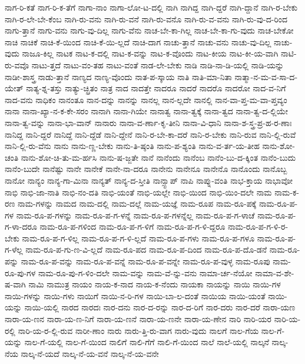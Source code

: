 {ನಾಗ-ರಿ-ಕತೆ
ನಾಗ-ರಿ-ಕ-ತೆಗೆ
ನಾಗಾ-ನಾಂ
ನಾಗಾ-ಲೋ-ಟ-ದಲ್ಲಿ
ನಾಗಿ
ನಾಗಿದ್ದ
ನಾಗಿ-ದ್ದರೆ
ನಾಗಿ-ದ್ದಾನೆ
ನಾಗಿ-ರ-ಬೇಕು
ನಾಗಿ-ರ-ಲೇ-ಬೇ-ಕೆಂಬ
ನಾಗಿ-ರು-ವನು
ನಾಗಿ-ರು-ವನೆ
ನಾಗಿ-ರು-ವನೊ
ನಾಗಿ-ರು-ವ-ವನು
ನಾಗಿ-ರು-ವು-ದ-ರಿಂದ
ನಾಗು-ತ್ತಾನೆ
ನಾಗು-ವನು
ನಾಗು-ವು-ದಿಲ್ಲ
ನಾಗು-ವೆನು
ನಾಚ-ಬೇ-ಕಾ-ಗಿಲ್ಲ
ನಾಚ-ಬೇ-ಕಾ-ಗು-ವುದು
ನಾಚ-ಬೇಕೋ
ನಾಚಿ
ನಾಚಿಕೆ
ನಾಚಿ-ಕೆ-ಯಿಂದ
ನಾಚಿ-ಕೆ-ಯಿ-ಲ್ಲದೆ
ನಾಚಿ-ದಾಗ
ನಾಚು-ತ್ತಾನೆ
ನಾಚು-ವನು
ನಾಚು-ವು-ದಿಲ್ಲ
ನಾಚು-ವುದು
ನಾಜೂ-ಕಿಲ್ಲ
ನಾಟಕ
ನಾಟ-ಕ-ದಲ್ಲಿ
ನಾಟ-ಕ-ವನ್ನು
ನಾಟ-ಕ-ವೊಂದು
ನಾಟ-ಕೀಯ
ನಾಟ-ಕೀ-ಯ-ವಾಗಿ
ನಾಟಿ-ರು-ವವೊ
ನಾಟು-ತ್ತದೆ
ನಾಟು-ವಂ-ತಹ
ನಾಟು-ವಂತೆ
ನಾಡ-ಲೇ-ಬೇಕು
ನಾಡಿ
ನಾಡಿ-ನಾ-ಡಿ-ಯಲ್ಲಿ
ನಾಡಿ-ಯನ್ನು
ನಾಡೀ-ಶಾಸ್ತ್ರ
ನಾಡು-ತ್ತಾನೆ
ನಾಣ್ಯದ
ನಾಣ್ಯ-ವೊಂದು
ನಾತ-ಪ-ಸ್ಕಾಯ
ನಾತಿ
ನಾತಿ-ಮಾ-ನಿತಾ
ನಾತ್ಮಾ-ನ-ಮ-ವ-ಸಾ-ದ-ಯೇತ್
ನಾತ್ಯ-ಶ್ನ-ತಸ್ತು
ನಾತ್ಯು-ಚ್ಛ್ರಿತಂ
ನಾತ್ರ
ನಾದ
ನಾದತ್ತೇ
ನಾದರೂ
ನಾದರೆ
ನಾದರೊ
ನಾದರೋ
ನಾದ-ವ-ನಿಗೆ
ನಾದ-ವನು
ನಾಧಿಕಂ
ನಾನಂತೂ
ನಾನ-ದನ್ನು
ನಾನನ್ನು
ನಾನಲ್ಲ
ನಾನ-ಲ್ಲದೇ
ನಾನಲ್ಲಿ
ನಾನ-ವಾ-ಪ್ತ-ಮ-ವಾ-ಪ್ತವ್ಯಂ
ನಾನಾ
ನಾನಾ-ಖ್ಯಾ-ನ-ಕ-ಕೇ-ಸರಂ
ನಾನಾಗಿ
ನಾನಾ-ಗಿಯೇ
ನಾನಾತ್ವ
ನಾನಾ-ತ್ವಕ್ಕೆ
ನಾನಾ-ತ್ವದ
ನಾನಾ-ತ್ವ-ದ-ಲ್ಲಿಯೇ
ನಾನಾ-ತ್ವ-ವನ್ನು
ನಾನಾ-ಭಾ-ವಾನ್
ನಾನಾರು
ನಾನಾ-ವ-ರ್ಣಾ-ಕೃ-ತೀನಿ
ನಾನಾ-ವಿ-ಧಾನಿ
ನಾನಾ-ಶ-ಸ್ತ್ರ-ಪ್ರ-ಹ-ರ-ಣಾಃ
ನಾನಿದ್ದ
ನಾನಿ-ದ್ದರೆ
ನಾನಿದ್ದೆ
ನಾನಿ-ದ್ದೆಡೆ
ನಾನಿ-ದ್ದೇನೆ
ನಾನಿ-ರ-ಬೇ-ಕಾ-ದರೆ
ನಾನಿ-ರ-ಬೇಕು
ನಾನಿ-ರುವ
ನಾನಿ-ಲ್ಲಿ-ರುವೆ
ನಾನಿ-ಲ್ಲಿ-ರು-ವೆನು
ನಾನು
ನಾನು-ಣ್ಣ-ಬೇಕು
ನಾನು-ತಿ-ಷ್ಠಂತಿ
ನಾನು-ಪ-ಶ್ಯಂತಿ
ನಾನು-ವ-ರ್ತ-ಯ-ತೀಹ
ನಾನು-ಶೋ-ಚಂತಿ
ನಾನು-ಶೋ-ಚಿ-ತು-ಮ-ರ್ಹಸಿ
ನಾನು-ಷ-ಜ್ಜತೇ
ನಾನೆ
ನಾನೆಂದು
ನಾನೆಂಬ
ನಾನೆಂ-ಬು-ದ-ಕ್ಕಿಂತ
ನಾನೆಂ-ಬುದು
ನಾನೆಂ-ಬುದೇ
ನಾನೆಷ್ಟು
ನಾನೇ
ನಾನೇಕೆ
ನಾನೇ-ನಾ-ದರೂ
ನಾನೇನು
ನಾನೇನೂ
ನಾನೇನೊ
ನಾನೊಂದು
ನಾನೊಬ್ಬ
ನಾನೋ
ನಾನ್ಯಂ
ನಾನ್ಯ-ಗಾ-ಮಿನಾ
ನಾನ್ಯತ್
ನಾನ್ಯ-ದ-ಸ್ತೀತಿ
ನಾನ್ಸ್ಟಾಪ್
ನಾಪಿ
ನಾಪ್ನು-ವಂತಿ
ನಾಭ-ಕ್ತಾಯ
ನಾಭಾವೋ
ನಾಭಿ
ನಾಭಿ-ಜಾ-ನಾತಿ
ನಾಭಿ-ನಂ-ದತಿ
ನಾಭಿ-ಯಂತೆ
ನಾಭಿ-ಯಲ್ಲೇ
ನಾಭಿ-ಯಿಂದ
ನಾಭಿ-ಯಿಂ-ದಲೇ
ನಾಮ
ನಾಮ-ಕ-ರಣ
ನಾಮ-ಗಳನ್ನು
ನಾಮದ
ನಾಮ-ದಲ್ಲಿ
ನಾಮ-ದಲ್ಲೆ
ನಾಮ-ಯಜ್ಞೆ
ನಾಮ-ರೂಪ
ನಾಮ-ರೂ-ಪಕ್ಕೆ
ನಾಮ-ರೂ-ಪ-ಗಳ
ನಾಮ-ರೂ-ಪ-ಗಳನ್ನು
ನಾಮ-ರೂ-ಪ-ಗ-ಳನ್ನೆ
ನಾಮ-ರೂ-ಪ-ಗಳನ್ನೆಲ್ಲ
ನಾಮ-ರೂ-ಪ-ಗ-ಳಾಚೆ
ನಾಮ-ರೂ-ಪ-ಗ-ಳಾ-ದರೂ
ನಾಮ-ರೂ-ಪ-ಗಳಿಂದ
ನಾಮ-ರೂ-ಪ-ಗ-ಳಿಗೆ
ನಾಮ-ರೂ-ಪ-ಗ-ಳಿ-ದ್ದರೂ
ನಾಮ-ರೂ-ಪ-ಗ-ಳಿ-ರ-ಬೇಕು
ನಾಮ-ರೂ-ಪ-ಗ-ಳಿಲ್ಲ
ನಾಮ-ರೂ-ಪ-ಗ-ಳಿ-ಲ್ಲದೆ
ನಾಮ-ರೂ-ಪ-ಗಳು
ನಾಮ-ರೂ-ಪ-ಗಳೂ
ನಾಮ-ರೂ-ಪ-ಗ-ಳೆಲ್ಲ
ನಾಮ-ರೂ-ಪ-ಗು-ಣ-ವಿ-ಲ್ಲದೆ
ನಾಮ-ರೂ-ಪದ
ನಾಮ-ರೂ-ಪ-ದಿಂದ
ನಾಮ-ರೂ-ಪ-ದೊ-ಡನೆ
ನಾಮ-ರೂ-ಪನ್ನು
ನಾಮ-ರೂ-ಪ-ವನ್ನು
ನಾಮ-ರೂ-ಪ-ವನ್ನೆ
ನಾಮ-ರೂ-ಪ-ವನ್ನೇ
ನಾಮ-ರೂ-ಪ-ವುಳ್ಳ
ನಾಮ-ರೂಪು
ನಾಮ-ರೂ-ಪು-ಗಳ
ನಾಮ-ರೂ-ಪು-ಗ-ಳಿಂ-ದಲೇ
ನಾಮ-ವನ್ನು
ನಾಮ-ವೆ-ನ್ನು-ವನು
ನಾಮಾ-ರ್ಚ-ನೆಯೋ
ನಾಮಾ-ವ-ಶೇ-ಷ-ವಾಗಿ
ನಾಮಿ
ನಾಮುತ್ರ
ನಾಯಂ
ನಾಯ-ಕ-ನಾದ
ನಾಯ-ಕ-ನೆಂದು
ನಾಯಕಾ
ನಾಯನ್ನು
ನಾಯಿ
ನಾಯಿ-ಗಳ
ನಾಯಿ-ಗಳನ್ನು
ನಾಯಿ-ಗಳು
ನಾಯಿಗೆ
ನಾಯಿ-ನ-ರಿ-ಗಳ
ನಾಯಿ-ಬಾ-ಲ-ದಂತೆ
ನಾಯಿಯ
ನಾಯಿ-ಯಂತೆ
ನಾಯಿ-ಯನ್ನು
ನಾಯಿ-ಯಲ್ಲಿ
ನಾರದ
ನಾರದಃ
ನಾರ-ದನು
ನಾರ-ದ-ರನ್ನು
ನಾರ-ದ-ರಿಗೆ
ನಾರ-ದರು
ನಾರ-ದರೆ
ನಾರಾ-ಯಣ
ನಾರಾ-ಯ-ಣನ
ನಾರಾ-ಯ-ಣ-ನಿಗೆ
ನಾರಾ-ಯ-ಣನೆ
ನಾರಾ-ಯ-ಣನೇ
ನಾರಾ-ಯ-ಣೇನ
ನಾರಿ
ನಾರಿ-ಯರ
ನಾರಿ-ಯ-ರಲ್ಲಿ
ನಾರಿ-ಯ-ರ-ಲ್ಲಿ-ರುವ
ನಾರೀ-ಣಾಂ
ನಾರು
ನಾರು-ತ್ತಿ-ರು-ವಾಗ
ನಾರು-ವುದು
ನಾಲಗೆ
ನಾಲ-ಗೆಯ
ನಾಲ-ಗೆ-ಯನ್ನು
ನಾಲ-ಗೆ-ಯಲ್ಲಿ
ನಾಲ-ಗೆ-ಯಿಂದ
ನಾಲಿಗೆ
ನಾಲಿ-ಗೆಗೆ
ನಾಲಿ-ಗೆ-ಯಿಂದ
ನಾಲೆ
ನಾಲೆ-ಯಲ್ಲಿ
ನಾಲ್ಕನೆ
ನಾಲ್ಕ-ನೆಯ
ನಾಲ್ಕ-ನೆ-ಯದೆ
ನಾಲ್ಕ-ನೆ-ಯ-ವನೆ
ನಾಲ್ಕ-ನೆ-ಯ-ವನೇ
}
